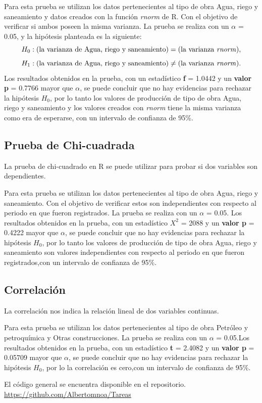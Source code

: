 \documentclass{article}
\begin{document}
Para esta prueba se utilizan los datos pertenecientes al tipo de obra Agua, riego y saneamiento y datos creados con la función \textit{rnorm} de R. Con el objetivo de verificar si ambos poseen la misma varianza. La prueba se realiza con un $\alpha$ = 0.05, y la hipótesis planteada es la siguiente:
\begin{equation}\label{eq:1}
H_{0}:\text{(la varianza de Agua, riego y saneamiento)} = \text{(la varianza \textit{rnorm})}, 
\end{equation}
\begin{equation}\label{eq:2}
H_{1}: \text{(la varianza de Agua, riego y saneamiento)} \neq \text{(la varianza \textit{rnorm})}. 
\end{equation}
Los resultados obtenidos en la prueba, con un estadístico  \textbf{f} = 1.0442 y un \textbf{valor p} = 0.7766 mayor que $\alpha$, se puede concluir que no hay evidencias para rechazar la hipótesis $H_{0}$, por lo tanto los valores de producción de  tipo de obra Agua, riego y saneamiento y los valores creados con \textit{rnorm} tiene la misma varianza como era de esperarse, con un intervalo de confianza de 95\%.

\subsection{Prueba de Chi-cuadrada}
La prueba de chi-cuadrado en R se puede utilizar para probar si dos variables son dependientes.

Para esta prueba se utilizan los datos pertenecientes al tipo de obra Agua, riego y saneamiento. Con el objetivo de verificar estos son independientes con respecto al periodo en que fueron registrados. La prueba se realiza con un $\alpha$ = 0.05. Los resultados obtenidos en la prueba, con un estadístico  \textbf{$X^{2}$} = 2088 y un \textbf{valor p} = 0.4222 mayor que $\alpha$, se puede concluir que no hay evidencias para rechazar la hipótesis $H_{0}$, por lo tanto los valores de producción de  tipo de obra Agua, riego y saneamiento son valores independientes con respecto al periodo en que fueron registrados,con un intervalo de confianza de 95\%.

\subsection{Correlación}
La correlación nos indica la relación lineal de dos variables continuas.

Para esta prueba se utilizan los datos pertenecientes al tipo de obra Petróleo y petroquímica y Otras construcciones. La prueba se realiza con un $\alpha$ = 0.05.Los resultados obtenidos en la prueba, con un estadístico  \textbf{t} = 2.4082 y un \textbf{valor p} = 0.05709 mayor que $\alpha$, se puede concluir que no hay evidencias para rechazar la hipótesis $H_{0}$, por lo la correlación es cero,con un intervalo de confianza de 95\%.


El código general se encuentra disponible en el repositorio. \href{https://github.com/Albertomnoa/Tareas_MPA/tree/master/Tarea4}{https://github.com/Albertomnoa/Tareas} 

\newpage


\end{document}
